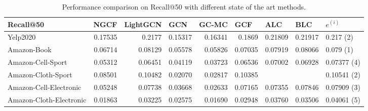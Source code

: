 \begin{table*}[]
    \centering
    \begin{tabular}{|l|r|r|r|r|r||r|r|l|}
        \hline
        Recall@50               & \multicolumn{1}{l|}{NGCF} & \multicolumn{1}{l|}{LightGCN} & \multicolumn{1}{l|}{GCN} & \multicolumn{1}{l|}{GC-MC} & \multicolumn{1}{l||}{GCF} & \multicolumn{1}{l|}{ALC} & \multicolumn{1}{l|}{BLC} & $e^{(i)}$   \\ \hline
        Yelp2020                & 0.17535                   & 0.2177                        & 0.15317                  & 0.16341                    & 0.1869                    & 0.21809                  & 0.21917                  & 0.217 (2)   \\ \hline
        Amazon-Book             & 0.06714                   & 0.08129                       & 0.05578                  & 0.05826                    & 0.07035                   & 0.07919                  & 0.08066                  & 0.079 (1)   \\ \hline
        Amazon-Cell-Sport       & 0.05312                   & 0.06451                       & 0.04119                  & 0.03723                    & 0.06536                   & 0.07002                  & 0.06928                  & 0.07377 (4) \\ \hline
        Amazon-Cloth-Sport      & 0.08501                   & 0.10482                       & 0.02070                  & 0.02817                    & 0.10385                   &                          &                          & 0.10541 (2) \\ \hline
        Amazon-Cell-Electronic  & 0.05248                   & 0.07738                       & 0.03668                  & 0.02633                    & 0.07165                   & 0.07355                  & 0.07846                  & 0.07909 (3) \\ \hline
        Amazon-Cloth-Electronic & 0.01863                   & 0.03225                       & 0.02575                  & 0.01690                    & 0.02948                   & 0.03760                  & 0.03506                  & 0.04061 (5) \\ \hline
    \end{tabular}
    \caption{Performance comparison on Recall@50 with different state of the art methods.}
    \label{tab:recallbaselines}
\end{table*}